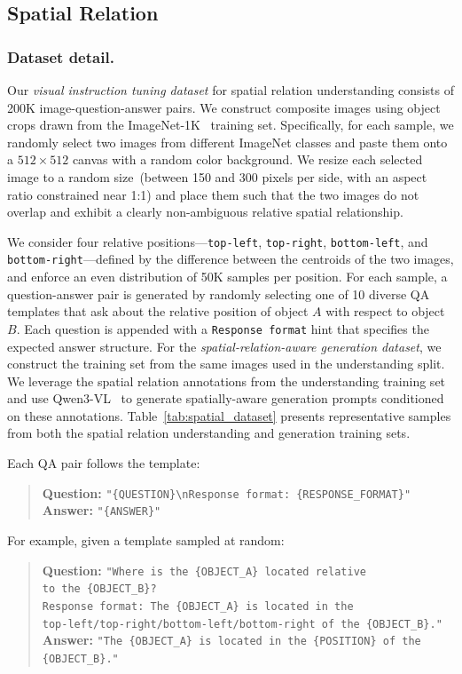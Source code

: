 \subsection{Spatial Relation}
\subsubsection{Dataset detail.}
Our \textit{visual instruction tuning dataset} for spatial relation understanding consists of 200K image-question-answer pairs. We construct composite images using object crops drawn from the ImageNet-1K~\cite{deng2009imagenet} training set. Specifically, for each sample, we randomly select two images from different ImageNet classes and paste them onto a $512 \times 512$ canvas with a random color background. We resize each selected image to a random size~(between 150 and 300 pixels per side, with an aspect ratio constrained near 1:1) and place them such that the two images do not overlap and exhibit a clearly non-ambiguous relative spatial relationship. 

We consider four relative positions—\texttt{top-left}, \texttt{top-right}, \texttt{bottom-left}, and \texttt{bottom-right}—defined by the difference between the centroids of the two images, and enforce an even distribution of 50K samples per position. For each sample, a question-answer pair is generated by randomly selecting one of 10 diverse QA templates that ask about the relative position of object $A$ with respect to object $B$. Each question is appended with a \texttt{Response format} hint that specifies the expected answer structure. For the \textit{spatial-relation-aware generation dataset}, we construct the training set from the same images used in the understanding split. We leverage the spatial relation annotations from the understanding training set and use Qwen3-VL~\cite{bai2025qwen3} to generate spatially-aware generation prompts conditioned on these annotations. Table~\ref{tab:spatial_dataset} presents representative samples from both the spatial relation understanding and generation training sets.

Each QA pair follows the template: 
\begin{quote}
\textbf{Question:} \texttt{"\{QUESTION\}\textbackslash nResponse format: \{RESPONSE\_FORMAT\}"} \\ 
\textbf{Answer:} \texttt{"\{ANSWER\}"} 
\end{quote} 

\noindent For example, given a template sampled at random: \begin{quote} \textbf{Question:} \texttt{"Where is the \{OBJECT\_A\} located relative \\ to the \{OBJECT\_B\}?} \\ \texttt{Response format: The \{OBJECT\_A\} is located in the \\ top-left/top-right/bottom-left/bottom-right of the \{OBJECT\_B\}."} \\ \textbf{Answer:} \texttt{"The \{OBJECT\_A\} is located in the \{POSITION\} of the \{OBJECT\_B\}."} \end{quote} 

